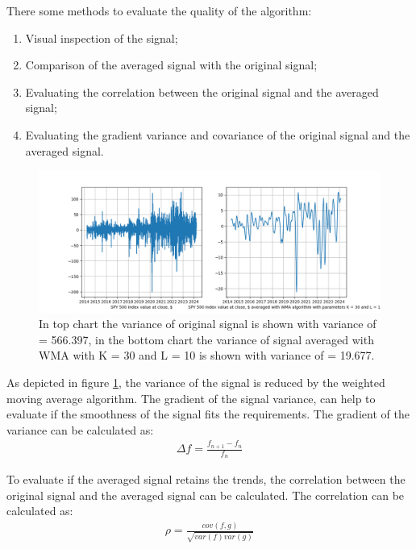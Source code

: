 \documentclass[a4paper,12pt,fleqn]{article}
\begin{document}
                There some methods to evaluate the quality of the algorithm:
                \begin{enumerate}
                    \item Visual inspection of the signal;
                    \item Comparison of the averaged signal with the original signal;
                    \item Evaluating the correlation between the original signal and the averaged signal;
                    \item Evaluating the gradient variance and covariance of the original signal and the averaged signal.
                \end{enumerate}
                \begin{figure}[ht]
                    \centering
                    \includegraphics[width=1\textwidth]{images/WMA_ex_2.png} %
                    \caption{In top chart the variance of original signal is shown with variance of = 566.397,
                    in the bottom chart the variance of signal averaged with WMA with K = 30 and L = 10 is shown with variance of = 19.677.}
                \label{fig:WMA_ex_2}
                \end{figure}

                As depicted in figure \ref{fig:WMA_ex_2}, the variance of the signal is reduced by the weighted moving average algorithm.
                The gradient of the signal variance, can help to evaluate if the smoothness of the signal fits the requirements.
                The gradient of the variance can be calculated as:
                \begin{gather}
                    \Delta f = \frac{f_{n+1} - f_n}{f_n}
                \end{gather}

                To evaluate if the averaged signal retains the trends, the correlation between the original signal and the averaged signal 
                can be calculated. The correlation can be calculated as:
                \begin{gather}
                    \rho = \frac{cov(f,g)}{\sqrt{var(f)var(g)}}
                \end{gather}
\end{document}
